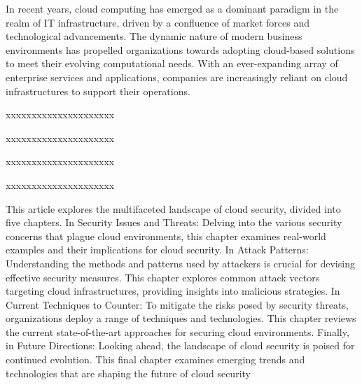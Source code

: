 In recent years, cloud computing has emerged as a dominant paradigm in the realm of IT infrastructure, driven by a confluence of market forces and technological advancements. The dynamic nature of modern business environments has propelled organizations towards adopting cloud-based solutions to meet their evolving computational needs. With an ever-expanding array of enterprise services and applications, companies are increasingly reliant on cloud infrastructures to support their operations.


xxxxxxxxxxxxxxxxxxxxx

xxxxxxxxxxxxxxxxxxxxx

xxxxxxxxxxxxxxxxxxxxx

xxxxxxxxxxxxxxxxxxxxx

This article explores the multifaceted landscape of cloud security, divided into five chapters. In Security Issues and Threats: Delving into the various security concerns that plague cloud environments, this chapter examines real-world examples and their implications for cloud security. In Attack Patterns: Understanding the methods and patterns used by attackers is crucial for devising effective security measures. This chapter explores common attack vectors targeting cloud infrastructures, providing insights into malicious strategies. In Current Techniques to Counter: To mitigate the risks posed by security threats, organizations deploy a range of techniques and technologies. This chapter reviews the current state-of-the-art approaches for securing cloud environments. Finally, in Future Directions: Looking ahead, the landscape of cloud security is poised for continued evolution. This final chapter examines emerging trends and technologies that are shaping the future of cloud security